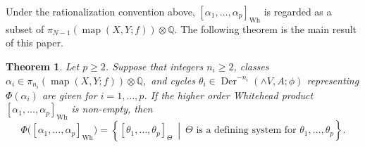 \documentclass[a4paper,10pt]{amsart}
\newtheorem{thm}{Theorem}[section]
\theoremstyle{definition}
\theoremstyle{remark}
\newcommand{\map}{\operatorname{map}}
\newcommand{\Der}{\operatorname{Der}}
\numberwithin{equation}{section}
\begin{document}
Under the rationalization convention above,
$[\alpha_1,\ldots,\alpha_p]_{\mathrm{Wh}}$ is regarded as a subset of
$\pi_{N-1}(\map(X,Y;f))\otimes\mathbb Q$.
The following theorem is the main result of this paper.

\begin{thm}\label{thm:main}
Let $p\geq2$. Suppose that integers $n_i\geq2$, classes
$
        \alpha_i\in
        \pi_{n_i}(\map(X,Y;f))\otimes\mathbb Q,
$
and cycles
$
        \theta_i\in\Der^{-n_i}(\wedge V,A;\phi)
$
representing $\Phi(\alpha_i)$ are given for $i=1,\ldots,p$.
If the higher order Whitehead product
$
        [\alpha_1,\ldots,\alpha_p]_{\mathrm{Wh}}
$
is non-empty, then
\[
\Phi\bigl([\alpha_1,\ldots,\alpha_p]_{\mathrm{Wh}}\bigr)
=
\left\{
[\theta_1,\ldots,\theta_p]_\Theta
\ \middle|\
\Theta \text{ is a defining system for } \theta_1,\ldots,\theta_p
\right\}.
\]
\end{thm}
\end{document}
